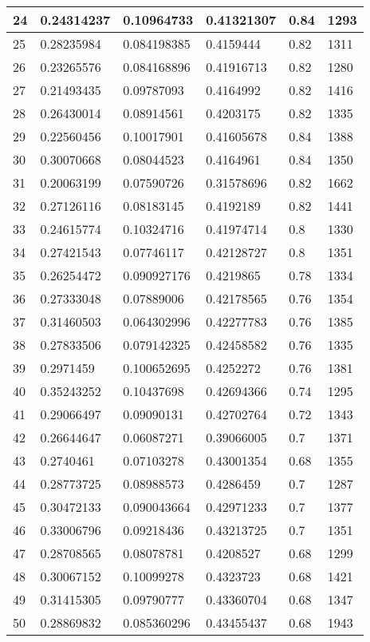 \begin{longtable}{|l|l|l|l|l|l|}
24 & 0.24314237 & 0.10964733 & 0.41321307 & 0.84 & 1293 \\ \hline 
25 & 0.28235984 & 0.084198385 & 0.4159444 & 0.82 & 1311 \\ \hline 
26 & 0.23265576 & 0.084168896 & 0.41916713 & 0.82 & 1280 \\ \hline 
27 & 0.21493435 & 0.09787093 & 0.4164992 & 0.82 & 1416 \\ \hline 
28 & 0.26430014 & 0.08914561 & 0.4203175 & 0.82 & 1335 \\ \hline 
29 & 0.22560456 & 0.10017901 & 0.41605678 & 0.84 & 1388 \\ \hline 
30 & 0.30070668 & 0.08044523 & 0.4164961 & 0.84 & 1350 \\ \hline 
31 & 0.20063199 & 0.07590726 & 0.31578696 & 0.82 & 1662 \\ \hline 
32 & 0.27126116 & 0.08183145 & 0.4192189 & 0.82 & 1441 \\ \hline 
33 & 0.24615774 & 0.10324716 & 0.41974714 & 0.8 & 1330 \\ \hline 
34 & 0.27421543 & 0.07746117 & 0.42128727 & 0.8 & 1351 \\ \hline 
35 & 0.26254472 & 0.090927176 & 0.4219865 & 0.78 & 1334 \\ \hline 
36 & 0.27333048 & 0.07889006 & 0.42178565 & 0.76 & 1354 \\ \hline 
37 & 0.31460503 & 0.064302996 & 0.42277783 & 0.76 & 1385 \\ \hline 
38 & 0.27833506 & 0.079142325 & 0.42458582 & 0.76 & 1335 \\ \hline 
39 & 0.2971459 & 0.100652695 & 0.4252272 & 0.76 & 1381 \\ \hline 
40 & 0.35243252 & 0.10437698 & 0.42694366 & 0.74 & 1295 \\ \hline 
41 & 0.29066497 & 0.09090131 & 0.42702764 & 0.72 & 1343 \\ \hline 
42 & 0.26644647 & 0.06087271 & 0.39066005 & 0.7 & 1371 \\ \hline 
43 & 0.2740461 & 0.07103278 & 0.43001354 & 0.68 & 1355 \\ \hline 
44 & 0.28773725 & 0.08988573 & 0.4286459 & 0.7 & 1287 \\ \hline 
45 & 0.30472133 & 0.090043664 & 0.42971233 & 0.7 & 1377 \\ \hline 
46 & 0.33006796 & 0.09218436 & 0.43213725 & 0.7 & 1351 \\ \hline 
47 & 0.28708565 & 0.08078781 & 0.4208527 & 0.68 & 1299 \\ \hline 
48 & 0.30067152 & 0.10099278 & 0.4323723 & 0.68 & 1421 \\ \hline 
49 & 0.31415305 & 0.09790777 & 0.43360704 & 0.68 & 1347 \\ \hline 
50 & 0.28869832 & 0.085360296 & 0.43455437 & 0.68 & 1943 \\ \hline 
\end{longtable}